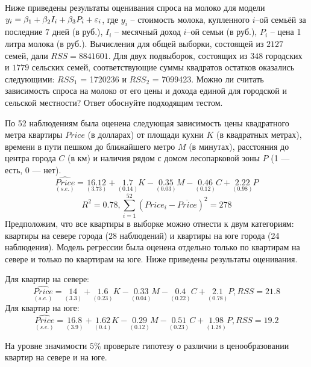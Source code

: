 \documentclass[pdftex,11pt,openany]{book}\usepackage[]{graphicx}\usepackage[]{color}
\begin{document}
\begin{problem}
 Ниже приведены результаты оценивания спроса на молоко для модели $y_i=\beta_1 + \beta_2 I_i + \beta_3 P_i + \varepsilon_i$, где $y_i$ -- стоимость молока, купленного $i$--ой семьёй за последние $7$ дней (в руб.), $I_i$ -- месячный доход $i$--ой семьи (в руб.), $P_i$ -- цена 1 литра молока (в руб.). Вычисления для общей выборки, состоящей из $2127$ семей, дали $RSS = 8841601$. Для двух подвыборок, состоящих из $348$ городских и $1779$ сельских семей, соответствующие суммы квадратов остатков оказались следующими: $RSS_1$ = 1720236 и $RSS_2$ = 7099423. Можно ли считать зависимость спроса на молоко от его цены и дохода единой для городской и сельской местности? Ответ обоснуйте подходящим тестом.
\end{problem}

\begin{solution}
\end{solution}


\begin{problem}
 По 52 наблюдениям была оценена следующая зависимость цены квадратного метра квартиры $Price$ (в долларах) от площади кухни $K$ (в квадратных метрах), времени в пути пешком до ближайшего метро $M$ (в минутах), расстояния до центра города $C$ (в км) и наличия рядом с домом лесопарковой зоны $P$ (1 --- есть, 0 --- нет).
\[
\underset{(s.e.)}{\widehat{Price}}=\underset{(3.73)}{16.12}+\underset{(0.14)}{1.7}K-\underset{(0.03)}{0.35}M-\underset{(0.12)}{0.46}C+\underset{(0.98)}{2.22}P
\]
\[
R^2=0.78, \sum_{i=1}^{52} {(Price_i-\overline{Price})^2}=278
\]
Предположим, что все квартиры в выборке можно отнести к двум категориям: квартиры на севере города (28 наблюдений) и квартиры на юге города (24 наблюдения). Модель регрессии была оценена отдельно только по квартирам на севере и только по квартирам на юге. Ниже приведены результаты оценивания.

Для квартир на севере:
\[
\underset{(s.e.)}{\widehat{Price}}=\underset{(3.3)}{14}+\underset{(0.23)}{1.6}K-\underset{(0.04)}{0.33}M-\underset{(0.22)}{0.4}C+\underset{(0.78)}{2.1}P, RSS=21.8
\]
Для квартир на юге:
\[
\underset{(s.e.)}{\widehat{Price}}=\underset{(3.9)}{16.8}+\underset{(0.4)}{1.62}K-\underset{(0.12)}{0.29}M-\underset{(0.23)}{0.51}C+\underset{(1.28)}{1.98}P, RSS=19.2
\]

На уровне значимости $5\%$ проверьте гипотезу о различии в ценообразовании квартир на севере и на юге.
\end{problem}

\begin{solution}
\end{solution}
\end{document}
